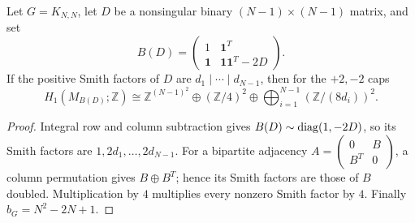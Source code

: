 \begin{corollary}
Let \(G=K_{N,N}\), let \(D\) be a nonsingular binary
\((N-1)\times(N-1)\) matrix, and set
\[
 B(D)=\begin{pmatrix}1&\mathbf1^T\\
 \mathbf1&\mathbf1\mathbf1^T-2D\end{pmatrix}.
\]
If the positive Smith factors of \(D\) are \(d_1\mid\cdots\mid d_{N-1}\),
then for the \(+2,-2\) caps
\[
 H_1(M_{B(D)};\mathbb Z)
 \cong \mathbb Z^{(N-1)^2}\oplus(\mathbb Z/4)^2
 \oplus\bigoplus_{i=1}^{N-1}(\mathbb Z/(8d_i))^2.
\]
\end{corollary}
\begin{proof}
Integral row and column subtraction gives
\(B(D)\sim\operatorname{diag}(1,-2D)\), so its Smith factors are
\(1,2d_1,\ldots,2d_{N-1}\). For a bipartite adjacency
\(A=\left(\begin{smallmatrix}0&B\\B^T&0\end{smallmatrix}\right)\),
a column permutation gives \(B\oplus B^T\); hence its Smith factors
are those of \(B\) doubled. Multiplication by \(4\) multiplies
every nonzero Smith factor by \(4\). Finally
\(b_G=N^2-2N+1\).
\end{proof}


